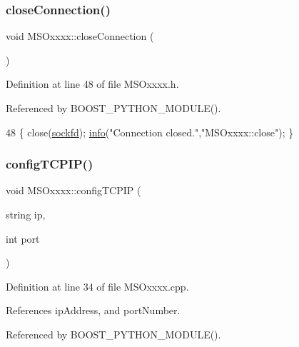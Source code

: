 \subsubsection{\texorpdfstring{close\+Connection()}{closeConnection()}}
{\footnotesize\ttfamily void M\+S\+Oxxxx\+::close\+Connection (\begin{DoxyParamCaption}{ }\end{DoxyParamCaption})\hspace{0.3cm}{\ttfamily [inline]}}



Definition at line 48 of file M\+S\+Oxxxx.\+h.



Referenced by B\+O\+O\+S\+T\+\_\+\+P\+Y\+T\+H\+O\+N\+\_\+\+M\+O\+D\+U\+L\+E().


\begin{DoxyCode}
48 \{   close(\hyperlink{classMSOxxxx_acf030a8f1ddd78d632816c856f50455c}{sockfd});    \hyperlink{classObject_a644fd329ea4cb85f54fa6846484b84a8}{info}(\textcolor{stringliteral}{"Connection closed."},\textcolor{stringliteral}{"MSOxxxx::close"});    \}
\end{DoxyCode}
\mbox{\label{classMSOxxxx_a3fc4e785c764c2abb0c0c2da4d71108a}} 
\subsubsection{\texorpdfstring{config\+T\+C\+P\+I\+P()}{configTCPIP()}}
{\footnotesize\ttfamily void M\+S\+Oxxxx\+::config\+T\+C\+P\+IP (\begin{DoxyParamCaption}\item[{string}]{ip,  }\item[{int}]{port }\end{DoxyParamCaption})}



Definition at line 34 of file M\+S\+Oxxxx.\+cpp.



References ip\+Address, and port\+Number.



Referenced by B\+O\+O\+S\+T\+\_\+\+P\+Y\+T\+H\+O\+N\+\_\+\+M\+O\+D\+U\+L\+E().



